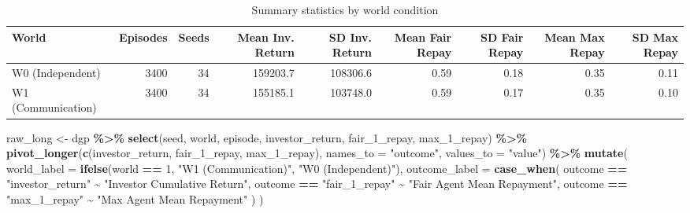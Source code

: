 \documentclass[
]{article}
\newenvironment{Shaded}{\begin{snugshade}}{\end{snugshade}}
\newcommand{\AttributeTok}[1]{\textcolor[rgb]{0.13,0.29,0.53}{#1}}
\newcommand{\DecValTok}[1]{\textcolor[rgb]{0.00,0.00,0.81}{#1}}
\newcommand{\FunctionTok}[1]{\textcolor[rgb]{0.13,0.29,0.53}{\textbf{#1}}}
\newcommand{\NormalTok}[1]{#1}
\newcommand{\OtherTok}[1]{\textcolor[rgb]{0.56,0.35,0.01}{#1}}
\newcommand{\SpecialCharTok}[1]{\textcolor[rgb]{0.81,0.36,0.00}{\textbf{#1}}}
\newcommand{\StringTok}[1]{\textcolor[rgb]{0.31,0.60,0.02}{#1}}
\begin{document}
\begin{longtable}[t]{lrrrrrrrr}
\caption{\label{tab:dgp-summary}Summary statistics by world condition}\\
\toprule
World & Episodes & Seeds & Mean Inv. Return & SD Inv. Return & Mean Fair Repay & SD Fair Repay & Mean Max Repay & SD Max Repay\\
\midrule
W0 (Independent) & 3400 & 34 & 159203.7 & 108306.6 & 0.59 & 0.18 & 0.35 & 0.11\\
W1 (Communication) & 3400 & 34 & 155185.1 & 103748.0 & 0.59 & 0.17 & 0.35 & 0.10\\
\bottomrule
\end{longtable}

\begin{Shaded}
\begin{Highlighting}[]
\NormalTok{raw\_long }\OtherTok{\textless{}{-}}\NormalTok{ dgp }\SpecialCharTok{\%\textgreater{}\%}
  \FunctionTok{select}\NormalTok{(seed, world, episode, investor\_return, fair\_1\_repay, max\_1\_repay) }\SpecialCharTok{\%\textgreater{}\%}
  \FunctionTok{pivot\_longer}\NormalTok{(}\FunctionTok{c}\NormalTok{(investor\_return, fair\_1\_repay, max\_1\_repay),}
               \AttributeTok{names\_to =} \StringTok{"outcome"}\NormalTok{, }\AttributeTok{values\_to =} \StringTok{"value"}\NormalTok{) }\SpecialCharTok{\%\textgreater{}\%}
  \FunctionTok{mutate}\NormalTok{(}
    \AttributeTok{world\_label =} \FunctionTok{ifelse}\NormalTok{(world }\SpecialCharTok{==} \DecValTok{1}\NormalTok{, }\StringTok{"W1 (Communication)"}\NormalTok{, }\StringTok{"W0 (Independent)"}\NormalTok{),}
    \AttributeTok{outcome\_label =} \FunctionTok{case\_when}\NormalTok{(}
\NormalTok{      outcome }\SpecialCharTok{==} \StringTok{"investor\_return"} \SpecialCharTok{\textasciitilde{}} \StringTok{"Investor Cumulative Return"}\NormalTok{,}
\NormalTok{      outcome }\SpecialCharTok{==} \StringTok{"fair\_1\_repay"} \SpecialCharTok{\textasciitilde{}} \StringTok{"Fair Agent Mean Repayment"}\NormalTok{,}
\NormalTok{      outcome }\SpecialCharTok{==} \StringTok{"max\_1\_repay"} \SpecialCharTok{\textasciitilde{}} \StringTok{"Max Agent Mean Repayment"}
\NormalTok{    )}
\NormalTok{  )}


\end{Highlighting}
\end{Shaded}
\end{document}
